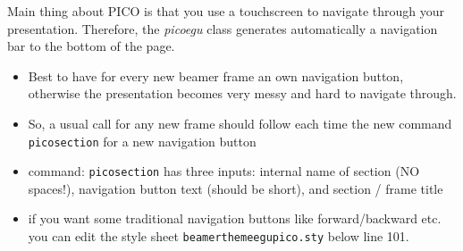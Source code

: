 \documentclass[usepdftitle=false,unknownkeysallowed,8pt]{beamer}
\begin{document}
 \begin{frame}

   Main thing about PICO is that you use a touchscreen to navigate through your presentation. Therefore, the \textit{picoegu} class generates automatically a navigation bar to the bottom of the page.

   \begin{itemize}%
   \item Best to have for every new beamer frame an own navigation button, otherwise the presentation becomes very messy and hard to navigate through.
   \item So, a usual call for any new frame should follow each time the new command \texttt{picosection} for a new navigation button
   \item command: \texttt{picosection} has three inputs: internal name of section (NO spaces!), navigation button text (should be short), and section / frame title\\
  \item if you want some traditional navigation buttons like forward/backward etc. you can edit the style sheet \texttt{beamerthemeegupico.sty} below line 101.

   \end{itemize}



 \end{frame}

\end{document}
